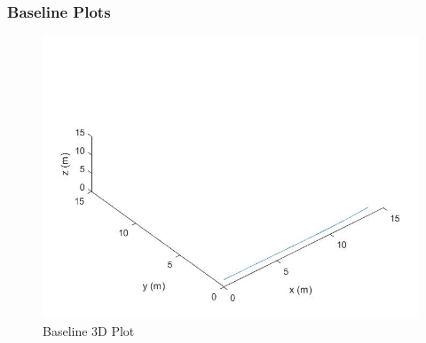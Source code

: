 \documentclass[12pt,twoside,letterpaper]{article}
\begin{document}
\subsubsection{Baseline Plots}
\begin{figure}[H]
\centering
\includegraphics[width=15cm]{figures/baseline_3D.jpg}
\caption{Baseline 3D Plot}
\label{Baseline 3D Plot}
\end{figure}
\end{document}
